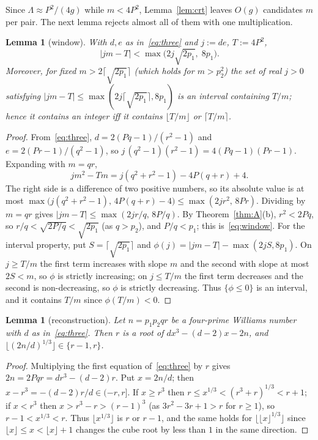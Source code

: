 \documentclass[11pt]{amsart}
\newtheorem{lemma}[theorem]{Lemma}
\theoremstyle{definition}
\theoremstyle{remark}
\begin{document}
Since $\Lambda\approx P^2/(4g)$ while $m<4P^2$, Lemma~\ref{lem:crt} leaves $O(g)$ candidates $m$ per pair. The next lemma rejects almost all of them with one multiplication.

\begin{lemma}[window]\label{lem:window}
With $d,e$ as in~\eqref{eq:three} and $j:=de$, $T:=4P^2$,
\begin{equation}\label{eq:window}
|jm-T|<\max\bigl(2j\sqrt{2p_1},\;8p_1\bigr).
\end{equation}
Moreover, for fixed $m>2\lceil\sqrt{2p_1}\rceil$ (which holds for $m>p_2^2$) the set of real $j>0$ satisfying $|jm-T|\le\max(2j\lceil\sqrt{2p_1}\rceil,8p_1)$ is an interval containing $T/m$; hence it contains an integer iff it contains $\lfloor T/m\rfloor$ or $\lceil T/m\rceil$.
\end{lemma}
\begin{proof}
From~\eqref{eq:three}, $d=2(Pq-1)/(r^2-1)$ and $e=2(Pr-1)/(q^2-1)$, so $j\,(q^2-1)(r^2-1)=4(Pq-1)(Pr-1)$. Expanding with $m=qr$,
\[
jm^2-Tm=j(q^2+r^2-1)-4P(q+r)+4 .
\]
The right side is a difference of two positive numbers, so its absolute value is at most $\max\bigl(j(q^2+r^2-1),\,4P(q+r)-4\bigr)\le\max(2jr^2,\,8Pr)$. Dividing by $m=qr$ gives $|jm-T|\le\max(2jr/q,\,8P/q)$. By Theorem~\ref{thm:A}(b), $r^2<2Pq$, so $r/q<\sqrt{2P/q}<\sqrt{2p_1}$ (as $q>p_2$), and $P/q<p_1$; this is~\eqref{eq:window}. For the interval property, put $S=\lceil\sqrt{2p_1}\rceil$ and $\phi(j)=|jm-T|-\max(2jS,8p_1)$. On $j\ge T/m$ the first term increases with slope $m$ and the second with slope at most $2S<m$, so $\phi$ is strictly increasing; on $j\le T/m$ the first term decreases and the second is non-decreasing, so $\phi$ is strictly decreasing. Thus $\{\phi\le0\}$ is an interval, and it contains $T/m$ since $\phi(T/m)<0$.
\end{proof}

\begin{lemma}[reconstruction]\label{lem:cbrt}
Let $n=p_1p_2qr$ be a four-prime Williams number with $d$ as in~\eqref{eq:three}. Then $r$ is a root of $dx^3-(d-2)x-2n$, and $\lfloor(2n/d)^{1/3}\rfloor\in\{r-1,r\}$.
\end{lemma}
\begin{proof}
Multiplying the first equation of~\eqref{eq:three} by $r$ gives $2n=2Pqr=dr^3-(d-2)r$. Put $x=2n/d$; then $x-r^3=-(d-2)r/d\in(-r,r]$. If $x\ge r^3$ then $r\le x^{1/3}<(r^3+r)^{1/3}<r+1$; if $x<r^3$ then $x>r^3-r>(r-1)^3$ (as $3r^2-3r+1>r$ for $r\ge1$), so $r-1<x^{1/3}<r$. Thus $\lfloor x^{1/3}\rfloor$ is $r$ or $r-1$, and the same holds for $\lfloor\lfloor x\rfloor^{1/3}\rfloor$ since $\lfloor x\rfloor\le x<\lfloor x\rfloor+1$ changes the cube root by less than $1$ in the same direction.
\end{proof}
\end{document}
